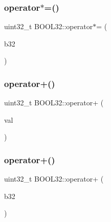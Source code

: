 \hypertarget{struct_b_o_o_l32_addac8d9da148feee45ec85a94124709a}{}\label{struct_b_o_o_l32_addac8d9da148feee45ec85a94124709a} 
\subsubsection{\texorpdfstring{operator$\ast$=()}{operator*=()}\hspace{0.1cm}{\footnotesize\ttfamily [2/2]}}
{\footnotesize\ttfamily uint32\+\_\+t B\+O\+O\+L32\+::operator$\ast$= (\begin{DoxyParamCaption}\item[{const \hyperlink{struct_b_o_o_l32}{B\+O\+O\+L32}}]{b32 }\end{DoxyParamCaption})\hspace{0.3cm}{\ttfamily [inline]}}

\hypertarget{struct_b_o_o_l32_aad0beeb169c1b861a4f279f8159a5c44}{}\label{struct_b_o_o_l32_aad0beeb169c1b861a4f279f8159a5c44} 
\subsubsection{\texorpdfstring{operator+()}{operator+()}\hspace{0.1cm}{\footnotesize\ttfamily [1/2]}}
{\footnotesize\ttfamily uint32\+\_\+t B\+O\+O\+L32\+::operator+ (\begin{DoxyParamCaption}\item[{const uint32\+\_\+t}]{val }\end{DoxyParamCaption})\hspace{0.3cm}{\ttfamily [inline]}}

\hypertarget{struct_b_o_o_l32_acb3d1666d776c603913af221dcb313d5}{}\label{struct_b_o_o_l32_acb3d1666d776c603913af221dcb313d5} 
\subsubsection{\texorpdfstring{operator+()}{operator+()}\hspace{0.1cm}{\footnotesize\ttfamily [2/2]}}
{\footnotesize\ttfamily uint32\+\_\+t B\+O\+O\+L32\+::operator+ (\begin{DoxyParamCaption}\item[{const \hyperlink{struct_b_o_o_l32}{B\+O\+O\+L32}}]{b32 }\end{DoxyParamCaption})\hspace{0.3cm}{\ttfamily [inline]}}

